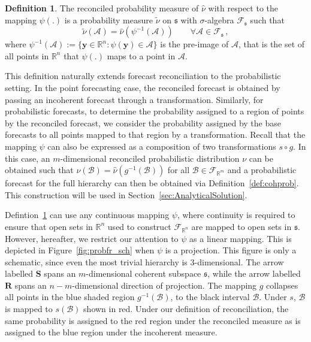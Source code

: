 \documentclass[12pt]{article}
\theoremstyle{definition}
\newtheorem{definition}{Definition}[section]
\begin{document}
\begin{definition} \label{def:reconprob}
	The reconciled probability measure of $\hat{\nu}$ with respect to the mapping $\psi(.)$ is a probability measure $\tilde{\nu}$ on $\mathfrak{s}$ with $\sigma$-algebra $\mathscr{F}_\mathfrak{s}$ such that
	\[
	\tilde{\nu}(\mathcal{A}) =  \hat{\nu}(\psi^{-1}(\mathcal{A})) \qquad \forall \mathcal{A} \in \mathscr{F}_{\mathfrak{s}}\,,
	\]
	where $\psi^{-1}(\mathcal{A}):=\{{\bm{y}}\in \mathbb{R}^n:\psi({\bm{y}})\in \mathcal{A}\}$ is the pre-image of $\mathcal{A}$, that is the set of all points in $\mathbb{R}^n$ that $\psi(.)$ maps to a point in $\mathcal{A}$.
\end{definition}

This definition naturally extends forecast reconciliation to the probabilistic setting. In the point forecasting case, the reconciled forecast is obtained by passing an incoherent forecast through a transformation. Similarly, for probabilistic forecasts, to determine the probability assigned to a region of points by the reconciled forecast, we consider the probability assigned by the base forecasts to all points mapped to that region by a transformation.  Recall that the mapping $\psi$ can also be expressed as a composition of two transformations $s\circ g$. In this case, an $m$-dimensional reconciled probabilistic distribution $\nu$ can be obtained such that $\nu(\mathcal{B})= \hat{\nu}(g^{-1}(\mathcal{B}))$ for all $\mathcal{B} \in \mathscr{F}_{\mathbb{R}^m}$ and a probabilistic forecast for the full hierarchy can then be obtained via Definition~\ref{def:cohprob}.  This construction will be used in Section~\ref{sec:AnalyticalSolution}.

Defintion~\ref{def:reconprob} can use any continuous mapping $\psi$, where continuity is required to ensure that open sets in $\mathbb{R}^n$ used to construct $\mathscr{F}_{\mathbb{R}^n}$ are mapped to open sets in $\mathfrak{s}$.  However, hereafter, we restrict our attention to $\psi$ as a linear mapping.  This is depicted in Figure~\ref{fig:probfr_sch} when $\psi$ is a projection.  This figure is only a schematic, since even the most trivial hierarchy is $3$-dimensional.  The arrow labelled $\bm{S}$ spans an $m$-dimensional coherent subspace $\mathfrak{s}$, while the arrow labelled $\bm{R}$ spans an $n-m$-dimensional direction of projection.  The mapping $g$ collapses all points in the blue shaded region $g^{-1}(\mathcal{B})$, to the black interval $\mathcal{B}$. Under $s$, $\mathcal{B}$ is mapped to $s(\mathcal{B})$ shown in red.  Under our definition of reconciliation, the same probability is assigned to the red region under the reconciled measure as is assigned to the blue region under the incoherent measure.
\end{document}
